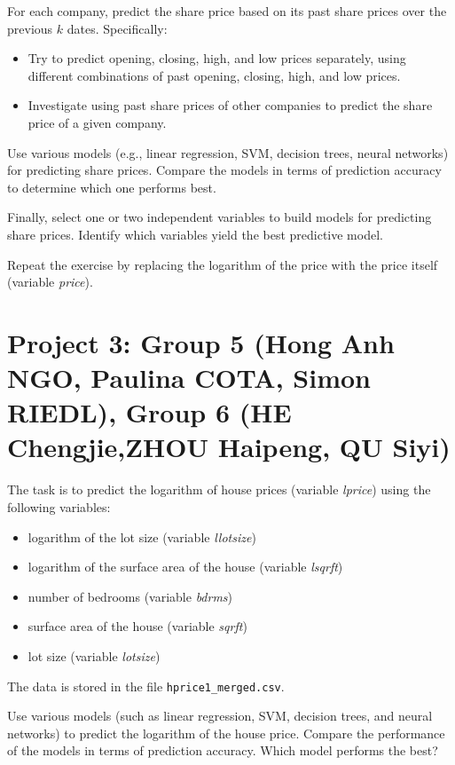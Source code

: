 \documentclass{article}
\begin{document}
For each company, predict the share price based on its past share prices over the previous $k$ dates. Specifically: \begin{itemize} \item Try to predict opening, closing, high, and low prices separately, using different combinations of past opening, closing, high, and low prices. \item Investigate using past share prices of other companies to predict the share price of a given company. \end{itemize}

Use various models (e.g., linear regression, SVM, decision trees, neural networks) for predicting share prices. Compare the models in terms of prediction accuracy to determine which one performs best.

Finally, select one or two independent variables to build models for predicting share prices. Identify which variables yield the best predictive model.

Repeat the exercise by replacing the logarithm of the price with the price itself (variable \emph{price}).


\section*{Project 3: Group 5 (Hong Anh NGO, Paulina COTA, Simon RIEDL), Group 6 (HE Chengjie,ZHOU Haipeng, QU Siyi)}

The task is to predict the logarithm of house prices (variable \emph{lprice}) using the following variables: \begin{itemize} \item logarithm of the lot size (variable \emph{llotsize}) \item logarithm of the surface area of the house (variable \emph{lsqrft}) \item number of bedrooms (variable \emph{bdrms}) \item surface area of the house (variable \emph{sqrft}) \item lot size (variable \emph{lotsize}) \end{itemize}

The data is stored in the file \lstinline$hprice1_merged.csv$.

Use various models (such as linear regression, SVM, decision trees, and neural networks) to predict the logarithm of the house price. Compare the performance of the models in terms of prediction accuracy. Which model performs the best?
\end{document}
